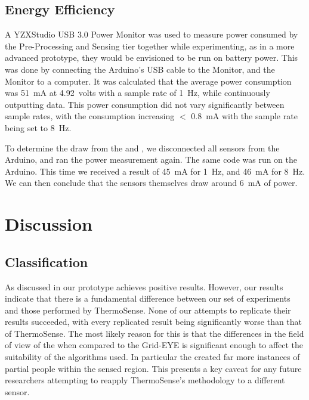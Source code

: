 \documentclass[../thesis/thesis.tex]{subfiles}
\begin{document}
\subsection{Energy Efficiency}
\label{subsec:energy}


A YZXStudio USB 3.0 Power Monitor was used to measure power consumed by the Pre-Processing and Sensing tier together while experimenting, as in a more advanced prototype, they would be envisioned to be run on battery power. This was done by connecting the Arduino's USB cable to the Monitor, and the Monitor to a computer. It was calculated that the average power consumption was 51~mA at 4.92~volts with a sample rate of 1~Hz, while continuously outputting data. This power consumption did not vary significantly between sample rates, with the consumption increasing $<$ 0.8~mA with the sample rate being set to 8~Hz.

To determine the draw from the \pir and \iar, we disconnected all sensors from the Arduino, and ran the power measurement again. The same code was run on the Arduino. This time we received a result of 45~mA for 1~Hz, and 46~mA for 8~Hz. We can then conclude that the sensors themselves draw around 6~mA of power.

\section{Discussion}

\subsection{Classification}

As discussed in  our prototype achieves positive results. However, our results indicate that there is a fundamental difference between our set of experiments and those performed by ThermoSense. None of our attempts to replicate their results succeeded, with every replicated result being significantly worse than that of ThermoSense. The most likely reason for this is that the differences in the field of view of the \mlx when compared to the Grid-EYE is significant enough to affect the suitability of the algorithms used. In particular the \mlx created far more instances of partial people within the sensed region. This presents a key caveat for any future researchers attempting to reapply ThermoSense's methodology to a different sensor.
\end{document}

